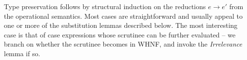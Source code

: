 \documentclass[acmsmall,review]{acmart}
\begin{document}

\TypePreservationTheorem
%
\ProgressTheorem
%
Type preservation
follows by structural induction on the reductions $e \longrightarrow
e'$ from the operational semantics. Most cases are straightforward and usually
appeal to one or more of the substitution lemmas described below. The most
interesting case is that of case expressions whose scrutinee can be further
evaluated -- we branch on whether the scrutinee becomes in WHNF, and invoke the
\emph{Irrelevance} lemma if so.
%
%
%
%






\end{document}
